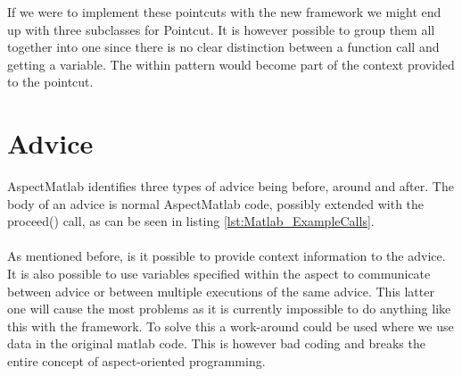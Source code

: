 \documentclass[a4paper]{report}
\begin{document}
If we were to implement these pointcuts with the new framework we might end up with three subclasses for Pointcut. It is however possible to group them all together into one since there is no clear distinction between a function call and getting a variable. The within pattern would become part of the context provided to the pointcut.

\section{Advice}
AspectMatlab identifies three types of advice being before, around and after. The body of an advice is normal AspectMatlab code, possibly extended with the proceed() call, as can be seen in listing \ref{lst:Matlab_ExampleCalls}.\\
\\
As mentioned before, is it possible to provide context information to the advice. It is also possible to use variables specified within the aspect to communicate between advice or between multiple executions of the same advice. This latter one will cause the most problems as it is currently impossible to do anything like this with the framework. To solve this a work-around could be used where we use data in the original matlab code. This is however bad coding and breaks the entire concept of aspect-oriented programming.
\end{document}
